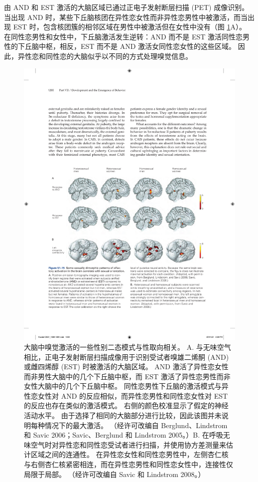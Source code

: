 由 AND 和 EST 激活的大脑区域已通过正电子发射断层扫描 (PET) 成像识别。 当出现 AND 时，某些下丘脑核团在异性恋女性而非异性恋男性中被激活，而当出现 EST 时，包含核团簇的相邻区域在男性中被激活但在女性中没有（图 \ref{fig:51_15}A）。 在同性恋男性和女性中，下丘脑激活发生逆转：AND 而不是 EST 激活同性恋男性的下丘脑中枢，相反，EST 而不是 AND 激活女同性恋女性的这些区域。 因此，异性恋和同性恋的大脑似乎以不同的方式处理嗅觉信息。

\begin{figure}[htbp]
	\centering
	\includegraphics[width=0.9\linewidth]{chap51/fig_51_15}
	\caption{大脑中嗅觉激活的一些性别二态模式与性取向相关。 A. 与无味空气相比，正电子发射断层扫描成像用于识别受试者嗅雄二烯酮 (AND) 或雌四烯醇 (EST) 时被激活的大脑区域。 AND 激活了异性恋女性而非男性大脑中的几个下丘脑中枢，而 EST 激活了异性恋男性而非女性大脑中的几个下丘脑中枢。 同性恋男性下丘脑的激活模式与异性恋女性对 AND 的反应相似，而异性恋男性和同性恋女性对 EST 的反应也存在类似的激活模式。 右侧的颜色校准显示了假定的神经活动水平。 由于选择了相同的大脑部分进行比较，因此该图并未说明每种情况下的最大激活。 （经许可改编自 Berglund、Lindstrom 和 Savic 2006；Savic、Berglund 和 Lindstrom 2005。）B. 在呼吸无味空气时对异性恋和同性恋受试者进行扫描，并使用协方差测量来估计区域之间的连通性。 在异性恋女性和同性恋男性中，左侧杏仁核与右侧杏仁核紧密相连，而在异性恋男性和同性恋女性中，连接性仅局限于局部。 （经许可改编自 Savic 和 Lindstrom 2008。）}
	\label{fig:51_15}
\end{figure}

